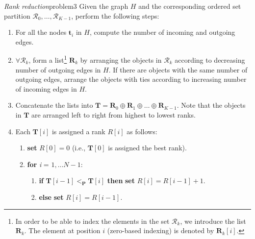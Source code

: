 \documentclass[acmsmall,screen, review]{acmart}
\begin{document}
\begin{mytheo}{\textit{Rank reduction}}{problem3}
	Given the graph $H$ and the corresponding ordered set partition $\mathcal{R}_0,\dots, \mathcal{R}_{K-1}$, perform the following steps:
	
	\begin{enumerate}
		\item For all the nodes $\mathbf{t}_i$ in $H$, compute the number of incoming  and  outgoing edges.
		
		\item $\forall \mathcal{R}_k$, form a list\footnote{In order to be able to index the elements in the set $\mathcal{R}_k$, we introduce the list $\mathbf{R}_k$. The element at position $i$ (zero-based indexing) is denoted by $\mathbf{R}_k[i]$.} $\mathbf{R}_k$ by arranging the objects  in $\mathcal{R}_k$ according to decreasing number of outgoing edges in $H$. If there are objects with the same number of outgoing edges, arrange the objects with ties according to increasing number of incoming edges in $H$.
		
		\item Concatenate the lists into
		 $\mathbf{T} = \mathbf{R}_0 \oplus \mathbf{R}_1 \oplus \ldots \oplus \mathbf{R}_{K-1}$. Note that the objects in $\mathbf{T}$ are arranged left to right from highest to lowest ranks.
		
		\item  Each $\mathbf{T}[i]$ is assigned  a rank $R[i]$  as follows: 
				\begin{enumerate}
						\item \textbf{set} $R[0] = 0$ (i.e., $\mathbf{T}[0]$ is assigned the best rank).
						\item \textbf{for} \textit{i} = $1,\dots N-1$:
						\begin{enumerate}
								\item \textbf{if} $\mathbf{T}[i-1]  <_{\mathbf{P}} \mathbf{T}[i]$ \textbf{then} \textbf{set} $R[i] = R[i-1] +1$.
								\item \textbf{else} \textbf{set} $R[i] = R[i-1]$.
							\end{enumerate}
					\end{enumerate}
	\end{enumerate}
\end{mytheo}
\end{document}
